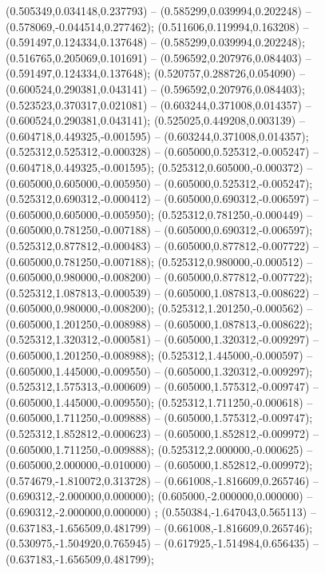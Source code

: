  (0.505349,0.034148,0.237793) -- (0.585299,0.039994,0.202248) -- (0.578069,-0.044514,0.277462);
 (0.511606,0.119994,0.163208) -- (0.591497,0.124334,0.137648) -- (0.585299,0.039994,0.202248);
 (0.516765,0.205069,0.101691) -- (0.596592,0.207976,0.084403) -- (0.591497,0.124334,0.137648);
 (0.520757,0.288726,0.054090) -- (0.600524,0.290381,0.043141) -- (0.596592,0.207976,0.084403);
 (0.523523,0.370317,0.021081) -- (0.603244,0.371008,0.014357) -- (0.600524,0.290381,0.043141);
 (0.525025,0.449208,0.003139) -- (0.604718,0.449325,-0.001595) -- (0.603244,0.371008,0.014357);
 (0.525312,0.525312,-0.000328) -- (0.605000,0.525312,-0.005247) -- (0.604718,0.449325,-0.001595);
 (0.525312,0.605000,-0.000372) -- (0.605000,0.605000,-0.005950) -- (0.605000,0.525312,-0.005247);
 (0.525312,0.690312,-0.000412) -- (0.605000,0.690312,-0.006597) -- (0.605000,0.605000,-0.005950);
 (0.525312,0.781250,-0.000449) -- (0.605000,0.781250,-0.007188) -- (0.605000,0.690312,-0.006597);
 (0.525312,0.877812,-0.000483) -- (0.605000,0.877812,-0.007722) -- (0.605000,0.781250,-0.007188);
 (0.525312,0.980000,-0.000512) -- (0.605000,0.980000,-0.008200) -- (0.605000,0.877812,-0.007722);
 (0.525312,1.087813,-0.000539) -- (0.605000,1.087813,-0.008622) -- (0.605000,0.980000,-0.008200);
 (0.525312,1.201250,-0.000562) -- (0.605000,1.201250,-0.008988) -- (0.605000,1.087813,-0.008622);
 (0.525312,1.320312,-0.000581) -- (0.605000,1.320312,-0.009297) -- (0.605000,1.201250,-0.008988);
 (0.525312,1.445000,-0.000597) -- (0.605000,1.445000,-0.009550) -- (0.605000,1.320312,-0.009297);
 (0.525312,1.575313,-0.000609) -- (0.605000,1.575312,-0.009747) -- (0.605000,1.445000,-0.009550);
 (0.525312,1.711250,-0.000618) -- (0.605000,1.711250,-0.009888) -- (0.605000,1.575312,-0.009747);
 (0.525312,1.852812,-0.000623) -- (0.605000,1.852812,-0.009972) -- (0.605000,1.711250,-0.009888);
 (0.525312,2.000000,-0.000625) -- (0.605000,2.000000,-0.010000) -- (0.605000,1.852812,-0.009972);
 (0.574679,-1.810072,0.313728) -- (0.661008,-1.816609,0.265746) -- (0.690312,-2.000000,0.000000);
 (0.605000,-2.000000,0.000000) -- (0.690312,-2.000000,0.000000) ;
 (0.550384,-1.647043,0.565113) -- (0.637183,-1.656509,0.481799) -- (0.661008,-1.816609,0.265746);
 (0.530975,-1.504920,0.765945) -- (0.617925,-1.514984,0.656435) -- (0.637183,-1.656509,0.481799);
